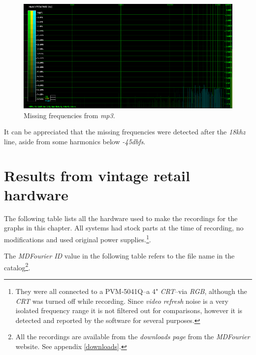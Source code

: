 \documentclass[10pt,a4paper]{report}
\newcommand{\ac}[1]{\textit{\acrshort{#1}}}
\newcommand{\khz}[1]{\textit{#1\acrshort{khz}}}
\newcommand{\db}[1]{\textit{#1\acrshort{dbfs}}}
\begin{document}
\begin{figure}[H]
	\centering
	\includegraphics[width=1.0\linewidth]{images/interpretation/Plot6-mp3-3.png}
	\caption[MP3 Missing]{Missing frequencies from \ac{mp3}.}
	\label{fig:plot6-mp3-3}
\end{figure}

It can be appreciated that the missing frequencies were detected after the \khz{18} line, aside from some harmonics below \db{-45}.

\chapter{Results from vintage retail hardware}
\label{results}

The following table lists all the hardware used to make the recordings for the graphs in this chapter. All systems had stock parts at the time of recording, no modifications and used original power supplies.\footnote{They were all connected to a PVM-5041Q--a 4" \textit{CRT}--via \textit{RGB}, although the \textit{CRT} was turned off while recording. Since \textit{video refresh} noise is a very isolated frequency range it is not filtered out for comparisons, however it is detected and reported by the software for several purposes.}. 

The \textit{MDFourier ID} value in the following table refers to the file name in the catalog\footnote{All the recordings are available from the \textit{downloads page} from the \textit{MDFourier} website. See appendix \ref{downloads}.}. 
\end{document}
